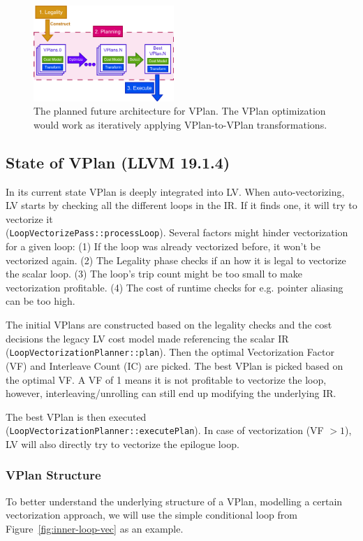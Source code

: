 \documentclass[sigplan,11pt,nonacm]{acmart}
\begin{document}
\begin{figure}
  \centering
  \includegraphics[width=0.475\textwidth]{images/vplan-future.png}
  \caption{The planned future architecture for VPlan. The VPlan optimization would
  work as iteratively applying VPlan-to-VPlan transformations.}
  \label{fig:vplan-future}
\end{figure}

\subsection{State of VPlan (LLVM 19.1.4)}

In its current state VPlan is deeply integrated into LV.
When auto-vectorizing, LV starts by checking all the different loops in the IR.
If it finds one, it will try to vectorize it\\(\texttt{LoopVectorizePass::processLoop}).
Several factors might hinder vectorization for a given loop: 
(1) If the loop was already vectorized before, it won't be vectorized again. 
(2) The Legality phase checks if an how it is legal to vectorize the scalar
loop. (3) The loop's trip count might be too small to make vectorization profitable. (4) The cost
of runtime checks for e.g. pointer aliasing can be too high.

The initial VPlans are constructed based on the legality checks and the cost decisions the legacy
LV cost model made referencing the scalar IR\\(\texttt{LoopVectorizationPlanner::plan}). Then the
optimal Vectorization Factor (VF) and Interleave Count (IC) are picked. 
The best VPlan is picked based on the optimal VF. A VF of 1 means it is not
profitable to vectorize the loop, however, interleaving/unrolling can still end up modifying the
underlying IR.

The best VPlan is then executed\\(\texttt{LoopVectorizationPlanner::executePlan}). In case of
vectorization (VF $>1$), LV will also directly try to vectorize the epilogue loop.

\subsubsection{VPlan Structure}
To better understand the
underlying structure of a VPlan, modelling a certain vectorization approach, we will use the
simple conditional loop from Figure~\ref{fig:inner-loop-vec} as an example.
\end{document}
